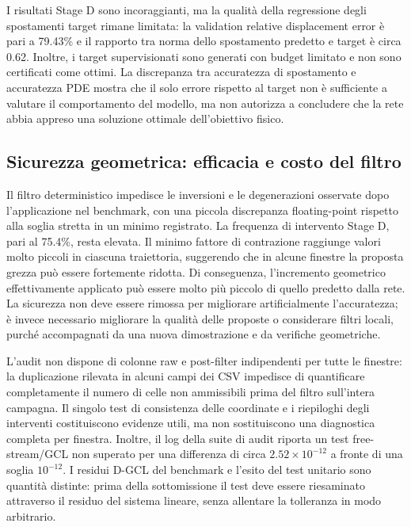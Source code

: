 I risultati Stage D sono incoraggianti, ma la qualità della regressione degli spostamenti target rimane limitata: la validation relative displacement error è pari a 79.43\% e il rapporto tra norma dello spostamento predetto e target è circa 0.62. Inoltre, i target supervisionati sono generati con budget limitato e non sono certificati come ottimi. La discrepanza tra accuratezza di spostamento e accuratezza PDE mostra che il solo errore rispetto al target non è sufficiente a valutare il comportamento del modello, ma non autorizza a concludere che la rete abbia appreso una soluzione ottimale dell'obiettivo fisico.

\subsection{Sicurezza geometrica: efficacia e costo del filtro}

Il filtro deterministico impedisce le inversioni e le degenerazioni osservate dopo l'applicazione nel benchmark, con una piccola discrepanza floating-point rispetto alla soglia stretta in un minimo registrato. La frequenza di intervento Stage D, pari al 75.4\%, resta elevata. Il minimo fattore di contrazione raggiunge valori molto piccoli in ciascuna traiettoria, suggerendo che in alcune finestre la proposta grezza può essere fortemente ridotta. Di conseguenza, l'incremento geometrico effettivamente applicato può essere molto più piccolo di quello predetto dalla rete. La sicurezza non deve essere rimossa per migliorare artificialmente l'accuratezza; è invece necessario migliorare la qualità delle proposte o considerare filtri locali, purché accompagnati da una nuova dimostrazione e da verifiche geometriche.

L'audit non dispone di colonne raw e post-filter indipendenti per tutte le finestre: la duplicazione rilevata in alcuni campi dei CSV impedisce di quantificare completamente il numero di celle non ammissibili prima del filtro sull'intera campagna. Il singolo test di consistenza delle coordinate e i riepiloghi degli interventi costituiscono evidenze utili, ma non sostituiscono una diagnostica completa per finestra. Inoltre, il log della suite di audit riporta un test free-stream/GCL non superato per una differenza di circa $2.52\times10^{-12}$ a fronte di una soglia $10^{-12}$. I residui D-GCL del benchmark e l'esito del test unitario sono quantità distinte: prima della sottomissione il test deve essere riesaminato attraverso il residuo del sistema lineare, senza allentare la tolleranza in modo arbitrario.

